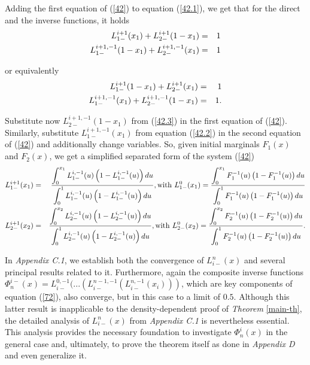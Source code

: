 \documentclass[onecolumn]{article}
\providecommand{\dint}{\displaystyle\int}
\renewcommand{\dint}{\displaystyle\int}
\begin{document}
Adding the first equation of (\ref{42}) to equation (\ref{42.1}), we get
that for the direct and the inverse functions, it holds%
\begin{eqnarray}
L_{1-}^{i+1}(x_{1})+L_{2-}^{i+1}(1-x_{1}) &=&1  \notag \\
L_{1-}^{i+1,-1}(1-x_{1})+L_{2-}^{i+1,-1}(x_{1}) &=&1  \label{42.2}
\end{eqnarray}

or equivalently%
\begin{eqnarray}
L_{1-}^{i+1}(1-x_{1})+L_{2-}^{i+1}(x_{1}) &=&1  \notag \\
L_{1-}^{i+1,-1}(x_{1})+L_{2-}^{i+1,-1}(1-x_{1}) &=&1.  \label{42.3}
\end{eqnarray}

Substitute now $L_{2-}^{i+1,-1}(1-x_{1})$ from (\ref{42.3}) in the first
equation of (\ref{42}). Similarly, substitute $L_{1-}^{i+1,-1}(x_{1})$ from
equation (\ref{42.2}) in the second equation of (\ref{42}) and additionally
change variables. So, given initial marginals $F_{1}(x)$ and $F_{2}(x)$, we
get a simplified separated form of the system (\ref{42}) 
\begin{eqnarray}
L_{1-}^{i+1}(x_{1}) &=&\frac{\dint\nolimits_{0}^{x_{1}}L_{1-}^{i,-1}(u)%
\left( 1-L_{1-}^{i,-1}(u)\right) du}{\dint\nolimits_{0}^{1}L_{1-}^{i,-1}(u)%
\left( 1-L_{1-}^{i,-1}(u)\right) du},\text{with }L_{1-}^{0}(x_{1})=\frac{%
\dint\nolimits_{0}^{x_{1}}F_{1}^{-1}(u)\left( 1-F_{1}^{-1}(u)\right) du}{%
\dint\nolimits_{0}^{1}F_{1}^{-1}(u)\left( 1-F_{1}^{-1}(u)\right) du}  \notag
\\
L_{2-}^{i+1}(x_{2}) &=&\frac{\dint\nolimits_{0}^{x_{2}}L_{2-}^{i,-1}(u)%
\left( 1-L_{2-}^{i,-1}(u)\right) du}{\dint\nolimits_{0}^{1}L_{2-}^{i,-1}(u)%
\left( 1-L_{2-}^{i,-1}(u)\right) du},\text{with }L_{2-}^{0}(x_{2})=\frac{%
\dint\nolimits_{0}^{x_{2}}F_{2}^{-1}(u)\left( 1-F_{2}^{-1}(u)\right) du}{%
\dint\nolimits_{0}^{1}F_{2}^{-1}(u)\left( 1-F_{2}^{-1}(u)\right) du}.
\label{42.4}
\end{eqnarray}

In \textit{Appendix C.1}, we establish both the convergence of $%
L_{i-}^{n}(x) $ and several principal results related to it. Furthermore,
again the composite inverse functions $\Phi
_{n}^{i-}(x)=L_{i-}^{0,-1}(...(L_{i-}^{n-1,-1}(L_{i-}^{n,-1}(x_{i})))$,
which are key components of equation (\ref{72}), also converge, but in this
case to a limit of $0.5$. Although this latter result is inapplicable to the
density-dependent proof of \textit{Theorem} \ref{main-th}, the detailed
analysis of $L_{i-}^{n}(x)$ from \textit{Appendix C.1} is nevertheless
essential. This analysis provides the necessary foundation to investigate $%
\Phi _{n}^{i}(x)$ in the general case and, ultimately, to prove the theorem
itself as done in \textit{Appendix D} and even generalize it. \textit{\ }
\end{document}
